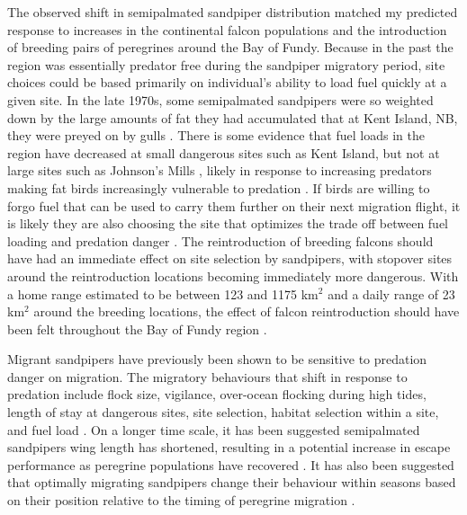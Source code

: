The observed shift in semipalmated sandpiper distribution matched my predicted response to increases in the continental falcon populations and the introduction of breeding pairs of peregrines around the Bay of Fundy. Because in the past the region was essentially predator free during the sandpiper migratory period, site choices could be based primarily on individual's ability to load fuel quickly at a given site. In the late 1970s, some semipalmated sandpipers were so weighted down by the large amounts of fat they had accumulated that at Kent Island, NB, they were preyed on by gulls \citep{Lank1983}. There is some evidence that fuel loads in the region have decreased at small dangerous sites such as Kent Island, but not at large sites such as Johnson's Mills \citep{hope2010influence}, likely in response to increasing predators making fat birds increasingly vulnerable to predation \citep{burns_effects_2002}. If birds are willing to forgo fuel that can be used to carry them further on their next migration flight, it is likely they are also choosing the site that optimizes the trade off between fuel loading and predation danger \citep{Pomeroy2008a,Taylor2007}. The reintroduction of breeding falcons should have had an immediate effect on site selection by sandpipers, with stopover sites around the reintroduction locations becoming immediately more dangerous. With a home range estimated to be between 123 and 1175 km$^2$ and a daily range of 23 km$^2$ around the breeding locations, the effect of falcon reintroduction should have been felt throughout the Bay of Fundy region \citep{Enderson1997a,Jenkins1998,Ganusevich2004}. 


Migrant sandpipers have previously been shown to be sensitive to predation danger on migration. The migratory behaviours that shift in response to predation include flock size, vigilance, over-ocean flocking during high tides, length of stay at dangerous sites, site selection, habitat selection within a site, and fuel load \citep{Dekker1998,ydenberg_western_2004,pomeroy_tradeoffs_2006,Pomeroy2008a,Sprague2008a}. On a longer time scale, it has been suggested semipalmated sandpipers wing length has shortened, resulting in a potential increase in escape performance as peregrine populations have recovered \citep{Lank2017}. It has also been suggested that optimally migrating sandpipers change their behaviour within seasons based on their position relative to the timing of peregrine migration \citep{Hope2014,Hope2011}. 

